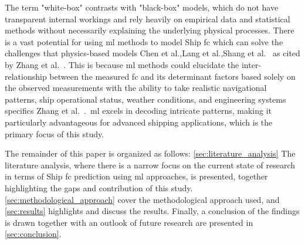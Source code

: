 The term "white-box" contrasts with "black-box" models, which do not have transparent internal workings and rely heavily on empirical data and statistical methods without necessarily explaining the underlying physical processes. There is a vast potential for using \ac{ml} methods to model Ship \ac{fc} which can solve the challenges that physics-based models Chen et al.,Lang et al.,Shang et al.~\citep{chenetal2023, lang2023data, shangetal2023} as cited by Zhang et al.~\citep{zhangDeepLearningMethod2024}.
This is because \ac{ml} methods could elucidate the inter-relationship between the measured \ac{fc} and its determinant factors based solely on the observed measurements with the ability to take realistic navigational patterns, ship operational status, weather conditions, and engineering systems specifics Zhang et al.~\citep{zhangDeepLearningMethod2024}.~\ac{ml} excels in decoding intricate patterns, making it particularly advantageous for advanced shipping applications, which is the primary focus of this study.

The remainder of this paper is organized as follows: \cref{sec:literature_analysis} The literature analysis, where there is a narrow focus on the current state of research in terms of Ship \ac{fc} prediction using \ac{ml} approaches, is presented, together highlighting the gaps and contribution of this study. \cref{sec:methodological_approach} cover the methodological approach used, and \cref{sec:results} highlights and discuss the results. Finally, a conclusion of the findings is drawn together with an outlook of future research are presented in \cref{sec:conclusion}.